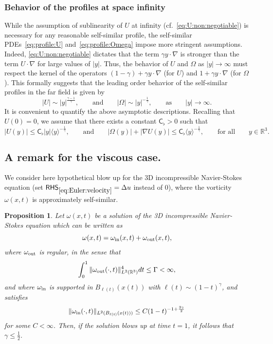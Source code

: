 \documentclass[11pt,reqno]{amsproc}
\numberwithin{equation}{section}
\newtheorem{proposition}[theorem]{Proposition}
\theoremstyle{remark}
\newcommand{\fr}{\frac}
\newcommand{\Rr}{{\mathbb R}}
\begin{document}
 

\subsubsection{Behavior of the profiles at space infinity}
While the assumption of  sublinearity of $U$ at infinity (cf.~\eqref{eq:U:non:negotiable}) is necessary for any reasonable self-similar profile, the self-similar PDEs~\eqref{eq:profile:U} and~\eqref{eq:profile:Omega} impose more stringent assumptions. Indeed, \eqref{eq:U:non:negotiable} dictates that the term $\gamma y \cdot \nabla$ is stronger than the term $U \cdot \nabla$ for large values of $|y|$. Thus, the behavior of $U$ and $\Omega$ as $|y|\to \infty$ must respect the kernel of the operators $(1-\gamma) + \gamma y \cdot \nabla$ (for $U$) and $1 +\gamma y \cdot \nabla$ (for $\Omega$). This formally suggests that the leading order behavior of the self-similar profiles in the far field is given by 
\[
|U| \sim |y|^{\frac{\gamma-1}{\gamma}} ,
\qquad\mbox{and}\qquad
|\Omega| \sim |y|^{-\frac{1}{\gamma}},
\qquad\mbox{as} \qquad |y|\to \infty.
\]
It is convenient to quantify the above asymptotic descriptions. Recalling that $U(0) = 0$, we assume that there exists a constant $\mathsf{C}_\flat > 0 $ such that
\begin{equation}
  |U(y)| \leq \mathsf{C}_\flat |y| \langle y\rangle^{-\frac{1}{\gamma}},
  \qquad
  \mbox{and}
  \qquad
  |\Omega(y)| + |\nabla U(y)| \leq \mathsf{C}_\flat  \langle y\rangle^{-\frac{1}{\gamma}},
  \qquad
  \mbox{for all}
  \qquad y\in\mathbb{R}^3.
  \label{eq:ass:medium:rare}
\end{equation}

\subsection{A remark for the viscous case.}
We consider here hypothetical  blow up  for the 3D incompressible Navier-Stokes equation {(set $\mathsf{RHS}_{\eqref{eq:Euler:velocity}} = \Delta u$ instead of $0$)}, where the vorticity $\omega(x,t)$ is approximately self-similar.

\begin{proposition}\label{nse}
Let $\omega(x,t)$ be a solution of the 3D incompressible Navier-Stokes equation which can be written as
\begin{equation*}
\omega(x,t) 
= {\omega_{\rm in}(x,t)} + \omega_{\rm out}(x,t),
\end{equation*}
where $\omega_{\rm out}$ is regular, in the sense that
\begin{equation}
\int_0^{{1}} \|\omega_{\rm out}(\cdot,t)\|_{L^2(\Rr^3)}^4dt 
\le \Gamma<\infty,
\label{omegaoutfine}
\end{equation}
and where $\omega_{\rm in}$ is supported in $B_{\ell(t)}(x(t))$
 with $\ell(t)\sim (1-t)^{\gamma}$, {and satisfies}
\begin{equation}
\|\omega_{\rm in}(\cdot,t)\|_{L^2(B_{\ell(t)}(x(t)))} \le  C (1-t)^{-1+\fr{3\gamma}{2}}
\label{omegainbad}
\end{equation}
{for some $C<\infty$.}
Then, if the solution blows up at time $t=1$, it follows that $\gamma\leq \frac{1}{2}$.
\end{proposition}
\end{document}
